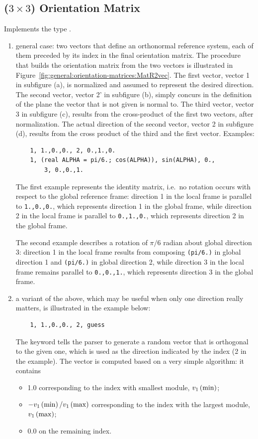 \subsection{($3 \times 3$) Orientation Matrix}
\label{sec:OrientationMatrix}
Implements the type .
\begin{enumerate}
\item general case: two vectors that define an orthonormal reference
system, each of them preceded by its index in the final orientation matrix.
The procedure that builds the orientation matrix from the two vectors
is illustrated in Figure~\ref{fig:general:orientation-matrices:MatR2vec}.
The first vector, vector 1 in subfigure (a), is normalized and assumed
to represent the desired direction.
The second vector, vector 2' in subfigure (b), simply concurs
in the definition of the plane the vector that is not given is normal to.
The third vector, vector 3 in subfigure (c), results from the cross-product
of the first two vectors, after normalization.
The actual direction of the second vector, vector 2 in subfigure (d),
results from the cross product of the third and the first vector.
Examples:
\begin{verbatim}
    1, 1.,0.,0., 2, 0.,1.,0.
    1, (real ALPHA = pi/6.; cos(ALPHA)), sin(ALPHA), 0.,
        3, 0.,0.,1.
\end{verbatim}
The first example represents the identity matrix, i.e.\ no rotation 
occurs with respect to the global reference frame: direction 1
in the local frame is parallel to \texttt{1.,0.,0.}, which represents
direction 1 in the global frame, while direction 2 in the local frame
is parallel to \texttt{0.,1.,0.}, which represents direction 2
in the global frame.

The second example describes a rotation of $ \pi/6 $ radian about
global direction 3: direction 1 in the local frame results from 
composing \texttt{(pi/6.)} in global direction 1
and \texttt{(pi/6.)}
in global direction 2, while direction 3 in the local frame remains
parallel to \texttt{0.,0.,1.}, which represents direction 3 in the global
frame.

\item a variant of the above, which may be useful when only one
direction really matters, is illustrated in the example below:
\begin{verbatim}
    1, 1.,0.,0., 2, guess
\end{verbatim}
The keyword  tells the parser to generate a random vector
that is orthogonal to the given one, which is used as the direction
indicated by the index (2 in the example).
The vector is computed based on a very simple algorithm: it contains
\begin{itemize}
        \item 1.0 corresponding to the index with smallest module,
        $v_1\left( \mathrm{min} \right)$;
	\item $-v_1\left( \mathrm{min} \right)/v_1\left( \mathrm{max} \right)$
	corresponding to the index with the largest module,
	$v_1\left( \mathrm{max} \right)$;
	\item 0.0 on the remaining index.
\end{itemize}


\end{enumerate}

